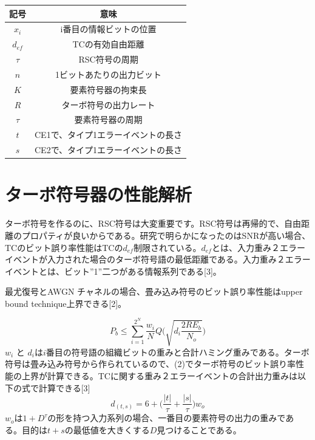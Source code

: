 \documentclass[twoside]{jsarticle}
\begin{document}
\begin{center}
 \begin{tabular}{||c c||} 
 \hline
 記号 & 意味\\ [0.5ex] 
 \hline\hline
 $x_i$ & i番目の情報ビットの位置  \\ 
 
  $d_{ef}$ &TCの有効自由距離  \\ 
  
   $\tau$ & RSC符号の周期  \\ 
 
 $n$ & 1ビットあたりの出力ビット  \\
 
 $K$ & 要素符号器の拘束長 \\
 
 $R$ & ターボ符号の出力レート \\
 
 $\tau$ &  要素符号器の周期 \\
 
 $t$ & CE1で、タイプ1エラーイベントの長さ\\ 
 
  $s$ & CE2で、タイプ1エラーイベントの長さ\\ [1ex] 
 \hline
\end{tabular}
\end{center}

\section{ターボ符号器の性能解析}
ターボ符号を作るのに、RSC符号は大変重要です。RSC符号は再帰的で、自由距離のプロパティが良いからである。研究で明らかになったのはSNRが高い場合、TCのビット誤り率性能はTCの$d_{ef}$制限されている。$d_{ef}$とは、入力重み２エラーイベントが入力された場合のターボ符号語の最低距離である。入力重み２エラーイベントとは、ビット''1''二つがある情報系列である[3]。

最尤復号とAWGN チャネルの場合、畳み込み符号のビット誤り率性能はupper bound technique上界できる[2]。


\begin{equation}
P_b \leq \sum_{i=1}^{2^N} \frac{w_i}{N}Q\Bigg( \sqrt{d_i\frac{2RE_b}{N_o}}\Bigg)
\end{equation}
 $w_i$ と $d_i$は$i$番目の符号語の組織ビットの重みと合計ハミング重みである。ターボ符号は畳み込み符号から作られているので、(2)でターボ符号のビット誤り率性能の上界が計算できる。TCに関する重み２エラーイベントの合計出力重みは以下の式で計算できる[3]
\begin{equation}
d_{(t,s)}=6+\Bigg( \frac{ \left|t\right|}{\tau} + \frac{ \left|s\right|}{\tau} \Bigg)w_o
\end{equation}
$w_o$は$1+D^\tau$の形を持つ入力系列の場合、一番目の要素符号の出力の重みである。目的は$t+s$の最低値を大きくする$D$見つけることである。
\end{document}
